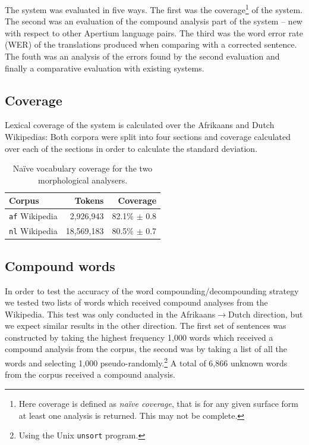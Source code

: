 \documentclass[11pt]{article}
\begin{document}
The system was evaluated in five ways. The first was the 
coverage\footnote{Here coverage is defined as \emph{na\"ive coverage}, 
that is for any given surface form at least one analysis is returned. This 
may not be complete.} of the system. The second was an evaluation of the 
compound analysis part of the system -- new with respect to other 
Apertium language pairs. The third was the word error 
rate (WER) of the translations produced when comparing with a 
corrected sentence. The fouth was an analysis of the errors found by the second
evaluation and finally a comparative evaluation with existing systems.

\subsection{Coverage}

Lexical coverage of the system is calculated over the Afrikaans and Dutch Wikipedias:
Both corpora were split into four sections and coverage calculated over each of the 
sections in order to calculate the standard deviation.

\begin{table}
  \begin{center}
  \begin{tabular}{|l|r|r|}
   \hline
   {\bf Corpus}           & {\bf Tokens}    & {\bf Coverage}\\
   \hline
   {\tt af} Wikipedia     & 2,926,943       & 82.1\% $\pm$ 0.8 \\
   \hline
   {\tt nl} Wikipedia     & 18,569,183      & 80.5\% $\pm$ 0.7 \\
   \hline
  \end{tabular}
    \caption{Na\"ive vocabulary coverage for the two morphological analysers.}
    \label{table:coverage}
  \end{center}
\end{table}

\subsection{Compound words}

In order to test the accuracy of the word compounding/decompounding strategy
we tested two lists of words which received compound analyses from 
the Wikipedia. This test was only conducted in the Afrikaans$\rightarrow$Dutch
direction, but we expect similar results in the other direction. The first
set of sentences was constructed by taking the highest frequency 1,000 words which received 
a compound analysis from the corpus, the second was by taking a list of all the words and selecting
1,000 pseudo-randomly.\footnote{Using the Unix {\small {\tt unsort}} program.} A total of
6,866 unknown words from the corpus received a compound analysis.
\end{document}

